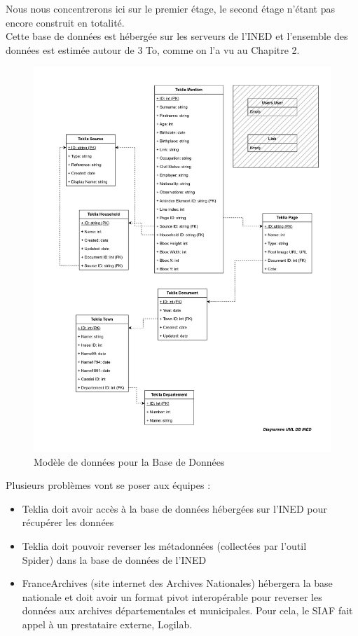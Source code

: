 Nous nous concentrerons ici sur le premier étage, le second étage n’étant pas encore construit en totalité.\\
Cette base de données est hébergée sur les serveurs de l’INED et l’ensemble des données est estimée autour de 3 To, comme on l'a vu au Chapitre 2. 
\clearpage

\begin{figure}[H]
        \centering
        \includegraphics[width=1.0\linewidth]{Figures/Partie 2/Fig.2.1 - Modèle de données - DB INED.jpg}
        \caption[Modèle de données pour la Base de Données]{Modèle de données pour la Base de Données}
        \label{fig:Fig2.1}
    \end{figure}
\clearpage

Plusieurs problèmes vont se poser aux équipes : 
\begin{itemize}[label=\textbullet]
    \item Teklia doit avoir accès à la base de données hébergées sur l’INED pour récupérer les données
    \item Teklia doit pouvoir reverser les métadonnées (collectées par l’outil \\Spider{}{}) dans la base de données de l’INED
    \item FranceArchives (site internet des Archives Nationales) hébergera la base nationale et doit avoir un format pivot interopérable pour reverser les données aux archives départementales et municipales. Pour cela, le SIAF fait appel à un prestataire externe, Logilab.
\end{itemize}

